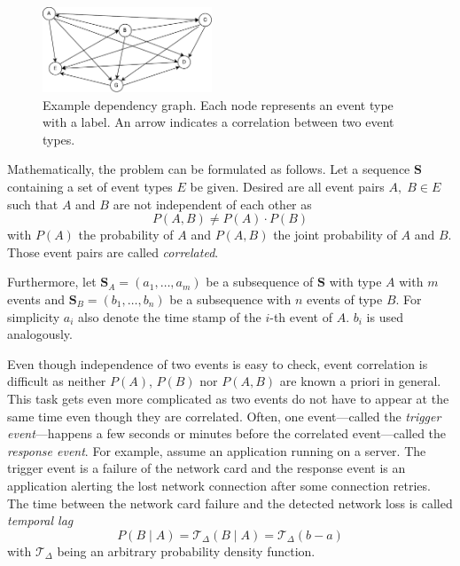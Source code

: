 \documentclass[conference]{IEEEtran}
\theoremstyle{examplestyle}
\begin{document}
\begin{figure}[!tb]
	\centering
	\includegraphics[width=0.45\textwidth]{images/graph.pdf}
	\caption{Example dependency graph. Each node represents an event type with a label. An arrow indicates a correlation between two event types.}
	\label{fig:exampleDependencyGraph}
\end{figure}


Mathematically, the problem can be formulated as follows. Let a sequence \(\pmb{S}\) containing a set of event types \(E\) be given. Desired are all event pairs \(A, \; B \in E\) such that \(A\) and \(B\) are not independent of each other as
\begin{equation}
	P(A, B) \neq P(A) \cdot P(B)
\end{equation}
with \(P(A)\) the probability of \(A\) and \(P(A, B)\) the joint probability of \(A\) and \(B\). Those event pairs are called \textit{correlated}.

Furthermore, let \(\pmb{S}_A = (a_1,\ldots, a_m)\) be a subsequence of \(\pmb{S}\) with type \(A\) with \(m\) events and \(\pmb{S}_B=(b_1,\ldots, b_n)\) be a subsequence with \(n\) events of type \(B\). For simplicity \(a_i\) also denote the time stamp of the \(i\)-th event of \(A\). \(b_i\) is used analogously.

Even though independence of two events is easy to check, event correlation is difficult as neither \(P(A)\), \(P(B)\) nor \(P(A, B)\) are known a priori in general. This task gets even more complicated as two events do not have to appear at the same time even though they are correlated. Often, one event---called the \textit{trigger event}---happens a few seconds or minutes before the correlated event---called the \textit{response event}. For example, assume an application running on a server. The trigger event is a failure of the network card and the response event is an application alerting the lost network connection after some connection retries. The time between the network card failure and the detected network loss is called \textit{temporal lag}
\begin{equation}
	P(B \; | \; A) = \mathcal{T}_\Delta (B \; | \; A) = \mathcal{T}_\Delta (b - a)
\end{equation}
with \(\mathcal{T}_\Delta\) being an arbitrary probability density function.
\end{document}
